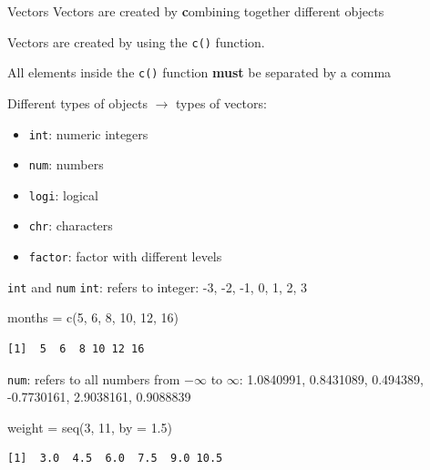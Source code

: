 \documentclass[
  ignorenonframetext,
]{beamer}
\newenvironment{Shaded}{\begin{snugshade}}{\end{snugshade}}
\newcommand{\AttributeTok}[1]{\textcolor[rgb]{0.00,0.34,0.68}{#1}}
\newcommand{\DecValTok}[1]{\textcolor[rgb]{0.69,0.50,0.00}{#1}}
\newcommand{\FloatTok}[1]{\textcolor[rgb]{0.69,0.50,0.00}{#1}}
\newcommand{\FunctionTok}[1]{\textcolor[rgb]{0.39,0.29,0.61}{#1}}
\newcommand{\NormalTok}[1]{\textcolor[rgb]{0.12,0.11,0.11}{#1}}
\newcommand{\OtherTok}[1]{\textcolor[rgb]{0.00,0.43,0.16}{#1}}
\providecommand{\tightlist}{%
  \setlength{\itemsep}{0pt}\setlength{\parskip}{0pt}}
\begin{document}
\begin{frame}[fragile]{Vectors}
\protect\hypertarget{vectors}{}
Vectors are created by \textbf{c}ombining together different objects

Vectors are created by using the \texttt{c()} function.

All elements inside the \texttt{c()} function \textbf{must} be separated
by a comma

Different types of objects \(\rightarrow\) types of vectors:

\begin{itemize}
\tightlist
\item
  \texttt{int}: numeric integers
\item
  \texttt{num}: numbers
\item
  \texttt{logi}: logical
\item
  \texttt{chr}: characters
\item
  \texttt{factor}: factor with different levels
\end{itemize}
\end{frame}

\begin{frame}[fragile]{\texttt{int} and \texttt{num}}
\protect\hypertarget{int-and-num}{}
\texttt{int}: refers to integer: -3, -2, -1, 0, 1, 2, 3

\begin{Shaded}
\begin{Highlighting}[]
\NormalTok{months }\OtherTok{=} \FunctionTok{c}\NormalTok{(}\DecValTok{5}\NormalTok{, }\DecValTok{6}\NormalTok{, }\DecValTok{8}\NormalTok{, }\DecValTok{10}\NormalTok{, }\DecValTok{12}\NormalTok{, }\DecValTok{16}\NormalTok{)}
\end{Highlighting}
\end{Shaded}

\begin{verbatim}
[1]  5  6  8 10 12 16
\end{verbatim}

\texttt{num}: refers to all numbers from \(-\infty\) to \(\infty\):
1.0840991, 0.8431089, 0.494389, -0.7730161, 2.9038161, 0.9088839

\begin{Shaded}
\begin{Highlighting}[]
\NormalTok{weight }\OtherTok{=} \FunctionTok{seq}\NormalTok{(}\DecValTok{3}\NormalTok{, }\DecValTok{11}\NormalTok{, }\AttributeTok{by =} \FloatTok{1.5}\NormalTok{) }
\end{Highlighting}
\end{Shaded}

\begin{verbatim}
[1]  3.0  4.5  6.0  7.5  9.0 10.5
\end{verbatim}
\end{frame}
\end{document}
